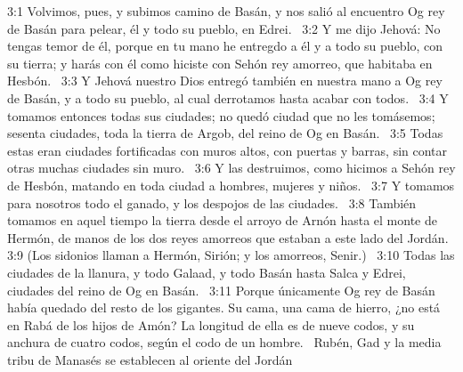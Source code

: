 3:1 Volvimos, pues, y subimos camino de Basán, y nos salió al encuentro Og rey de Basán para pelear, él y todo su pueblo, en Edrei.  
3:2 Y me dijo Jehová: No tengas temor de él, porque en tu mano he entregdo a él y a todo su pueblo, con su tierra; y harás con él como hiciste con Sehón rey amorreo, que habitaba en Hesbón.  
3:3 Y Jehová nuestro Dios entregó también en nuestra mano a Og rey de Basán, y a todo su pueblo, al cual derrotamos hasta acabar con todos.  
3:4 Y tomamos entonces todas sus ciudades; no quedó ciudad que no les tomásemos; sesenta ciudades, toda la tierra de Argob, del reino de Og en Basán.  
3:5 Todas estas eran ciudades fortificadas con muros altos, con puertas y barras, sin contar otras muchas ciudades sin muro.  
3:6 Y las destruimos, como hicimos a Sehón rey de Hesbón, matando en toda ciudad a hombres, mujeres y niños.  
3:7 Y tomamos para nosotros todo el ganado, y los despojos de las ciudades.  
3:8 También tomamos en aquel tiempo la tierra desde el arroyo de Arnón hasta el monte de Hermón, de manos de los dos reyes amorreos que estaban a este lado del Jordán.  
3:9 (Los sidonios llaman a Hermón, Sirión; y los amorreos, Senir.)  
3:10 Todas las ciudades de la llanura, y todo Galaad, y todo Basán hasta Salca y Edrei, ciudades del reino de Og en Basán.  
3:11 Porque únicamente Og rey de Basán había quedado del resto de los gigantes. Su cama, una cama de hierro, ¿no está en Rabá de los hijos de Amón? La longitud de ella es de nueve codos, y su anchura de cuatro codos, según el codo de un hombre.  
Rubén, Gad y la media tribu de Manasés se establecen al oriente del Jordán  

